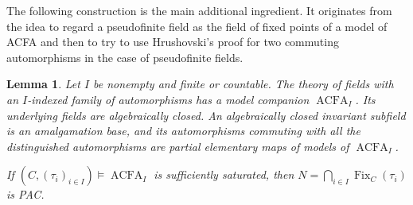 \documentclass[10pt,a4paper]{amsart}
\newtheorem{lemma}[theorem]{Lemma}
\theoremstyle{definition}
\DeclareMathOperator{\Fix}{Fix}
\begin{document}
The following construction is the main additional ingredient. It originates from the idea to regard a pseudofinite field as the field of fixed points of a model of ACFA and then to try to use Hrushovski's proof for two commuting automorphisms in the case of pseudofinite fields.
\begin{lemma}\label{b:lem:free}
Let $I$ be nonempty and finite or countable. The theory of fields with
an $I$-indexed family of automorphisms has a model companion $\operatorname{ACFA}_I$.
Its underlying fields are algebraically closed. An algebraically closed
invariant subfield is an amalgamation base, and its automorphisms
commuting with all the distinguished automorphisms are partial
elementary maps of models of $\operatorname{ACFA}_I$.

If $(C,(\tau_i)_{i\in I})\models \operatorname{ACFA}_I$ is sufficiently saturated,
then $N=\bigcap_{i\in I}\Fix_C(\tau_i)$ is PAC.
\end{lemma}
\end{document}
